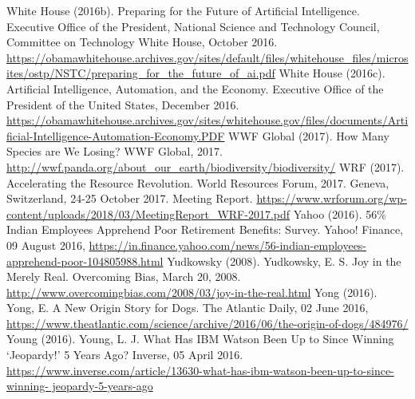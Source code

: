\begin{multicols}{2}
\begin{thebibliography}{99}
 White House (2016b). Preparing for the Future of Artificial Intelligence. Executive Office of the President, National Science and Technology Council, Committee on Technology White House, October 2016. \url{https://obamawhitehouse.archives.gov/sites/default/files/whitehouse_files/microsites/ostp/NSTC/preparing_for_the_future_of_ai.pdf}
 White House (2016c). Artificial Intelligence, Automation, and the Economy. Executive Office of the President of the United States, December 2016. \url{https://obamawhitehouse.archives.gov/sites/whitehouse.gov/files/documents/Artificial-Intelligence-Automation-Economy.PDF}
 WWF Global (2017). How Many Species are We Losing? WWF Global, 2017. \url{http://wwf.panda.org/about_our_earth/biodiversity/biodiversity/}
 WRF (2017). Accelerating the Resource Revolution. World Resources Forum, 2017. Geneva, Switzerland, 24-25 October 2017. Meeting Report. \url{https://www.wrforum.org/wp-content/uploads/2018/03/MeetingReport_WRF-2017.pdf}
 Yahoo (2016). 56\% Indian Employees Apprehend Poor Retirement Benefits: Survey. Yahoo! Finance, 09 August 2016, \url{https://in.finance.yahoo.com/news/56-indian-employees-apprehend-poor-104805988.html}
 Yudkowsky (2008). Yudkowsky, E. S. Joy in the Merely Real. Overcoming Bias, March 20, 2008. \url{http://www.overcomingbias.com/2008/03/joy-in-the-real.html}
 Yong (2016). Yong, E. A New Origin Story for Dogs. The Atlantic Daily, 02 June 2016, \url{https://www.theatlantic.com/science/archive/2016/06/the-origin-of-dogs/484976/}
 Young (2016). Young, L. J. What Has IBM Watson Been Up to Since Winning ‘Jeopardy!’ 5 Years Ago? Inverse, 05 April 2016. \url{https://www.inverse.com/article/13630-what-has-ibm-watson-been-up-to-since-winning- jeopardy-5-years-ago}
\end{thebibliography}

\end{multicols}
